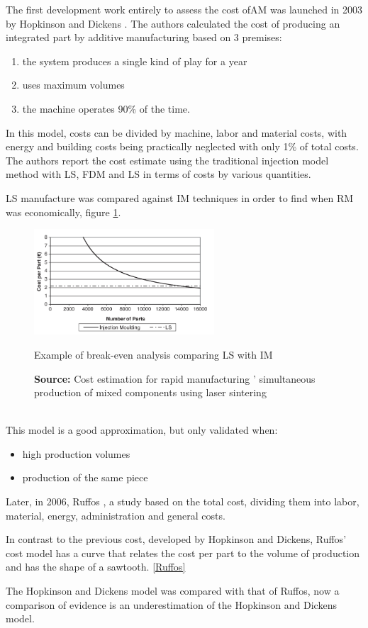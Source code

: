 The first development work entirely to assess the cost of\ac{AM} was launched in 2003 by Hopkinson and Dickens \cite{hopkinson2003analysis}. The authors calculated the cost of producing an integrated part by additive manufacturing based on 3 premises\cite{costabile2017cost}:
\begin{enumerate}
    \item the system produces a single kind of play for a year 
    \item uses maximum volumes 
    \item the machine operates 90\% of the time.  
\end{enumerate}


In this model, costs can be divided by machine, labor and material costs, with energy and building costs being practically neglected with only 1\% of total costs. \cite{thomas2014costs,costabile2017cost}
The authors report the cost estimate using the traditional injection model method with \ac{LS}, \ac{FDM} and \ac{LS} in terms of costs by various quantities.\par 
\ac{LS} manufacture was compared against \ac{IM} techniques in order to find when \ac{RM} was economically, figure \ref{HD}. 
\begin{figure}[h]
\centering
\includegraphics[width=0.6\textwidth]{./Images/HD.png}
\caption{Example of break-even analysis comparing LS with
IM}
\label{HD}
\caption*{\textbf{Source:} Cost estimation for rapid manufacturing ’ simultaneous production of mixed components using laser sintering \cite{ruffo2007cost}}
\end{figure}
\\
This model is a good approximation, but only validated when:
\begin{itemize}
    \item high production volumes
    \item production of the same piece
\end{itemize}

Later, in 2006, Ruffos \cite{ruffo2006cost}, a study based on the total cost, dividing them into labor, material, energy, administration and general costs.\cite{thomas2014costs,ruffo2007cost}\par
In contrast to the previous cost, developed by Hopkinson and Dickens, Ruffos' cost model has a curve that relates the cost per part to the volume of production and has the shape of a sawtooth. \cite{ruffo2007cost}\ref{Ruffos} \par
The Hopkinson and Dickens model was compared with that of Ruffos, now a comparison of evidence is an underestimation of the Hopkinson and Dickens model.\cite{thomas2014costs,ruffo2007cost}\par

